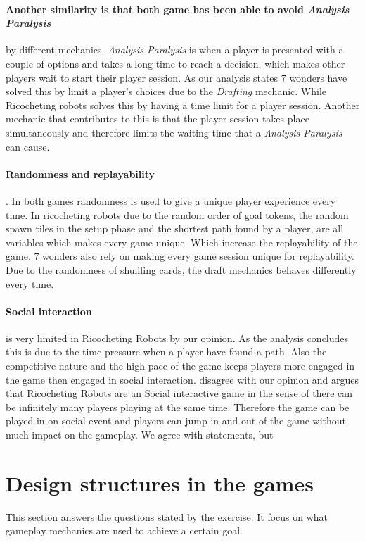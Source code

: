 \documentclass[a4paper]{article}
\begin{document}
  \paragraph{Another similarity is that both game has been able to avoid \textit{Analysis Paralysis}} by different mechanics. \textit{Analysis Paralysis} is when a player is presented with a couple of options and takes a long time to reach a decision, which makes other players wait to start their player session. As our analysis states 7 wonders have solved this by limit a player's choices due to the \textit{Drafting} mechanic. While Ricocheting robots solves this by having a time limit for a player session. Another mechanic that contributes to this is that the player session takes place simultaneously and therefore limits the waiting time that a \textit{Analysis Paralysis} can cause.

  \paragraph{Randomness and replayability}. In both games randomness is used to give a unique player experience every time. In ricocheting robots due to the random order of goal tokens, the random spawn tiles in the setup phase and the shortest path found by a player, are all variables which makes every game unique. Which increase the replayability of the game. 7 wonders also rely on making every game session unique for replayability. Due to the randomness of shuffling cards, the draft mechanics behaves differently every time.

  \paragraph{Social interaction} is very limited in Ricocheting Robots by our opinion. As the analysis concludes this is due to the time pressure when a player have found a path. Also the competitive nature and the high pace of the game keeps players more engaged in the game then engaged in social interaction.  disagree with our opinion and argues that Ricocheting Robots are an Social interactive game in the sense of there can be infinitely many players playing at the same time. Therefore the game can be played in on  social event and players can jump in and out of the game without much impact on the gameplay. We agree with \citeauthor{danbeckRR} statements, but 

\section{Design structures in the games}
This section answers the questions stated by the exercise. It focus on what gameplay mechanics are used to achieve a certain goal. 
\end{document}
